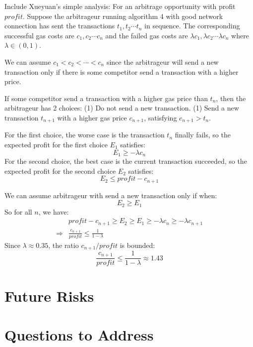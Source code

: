 \documentclass[conference]{IEEEtran}
\begin{document}
Include Xueyuan's simple analysis:
For an arbitrage opportunity with profit $profit$.
 Suppose the arbitrageur running algorithm 4 with good network connection has sent the transactions $t_1, t_2 \cdots t_{n}$ in sequence. The corresponding successful gas costs are $c_1, c_2 \cdots c_{n}$ and the failed gas costs are $\lambda c_1,\lambda c_2 \cdots \lambda c_{n}$ where $\lambda \in (0,1)$.
 
 We can assume $c_1 < c_2 < \cdots < c_{n}$ since the arbitrageur will send a new transaction only if there is some competitor send a transaction with a higher price.
 
 If some competitor send a transaction with a higher gas price than $t_{n}$, then the arbitrageur has 2 choices: (1) Do not send a new transaction. (1) Send a new transaction $t_{n+1}$ with a higher gas price $c_{n+1}$, satisfying $c_{n+1} > t_{n}$. 
 
 For the first choice, the worse case is the transaction $t_{n}$ finally fails, so the expected profit for the first choice $E_{1}$ satisfies:
 \[
 	E_1 \geq - \lambda c_{n}
 \]
 For the second choice, the best case is the current transaction succeeded, so the expected profit for the second choice $E_{2}$ satisfies:
 \[
 	E_2 \leq profit - c_{n+1}
 \]

 We can assume arbitrageur with send a new transaction only if when:
\[
	E_2 \geq E_1
\]
So for all $n$, we have:
\begin{align*}
	&profit - c_{n+1} \geq E_2 \geq E_1 \geq - \lambda c_{n} \geq - \lambda c_{n+1} \\
	\Rightarrow & \frac{c_{n+1}}{profit} \leq \frac{1}{1-\lambda}
\end{align*}
Since $\lambda \approx 0.35$, the ratio $c_{n+1}/profit$ is bounded:
\[
	\frac{c_{n+1}}{profit} \leq \frac{1}{1-\lambda} \approx 1.43
\] 

\section{Future Risks}
\label{sec:future_risks}



\pagebreak
\pagebreak
\section*{Questions to Address}
\end{document}
